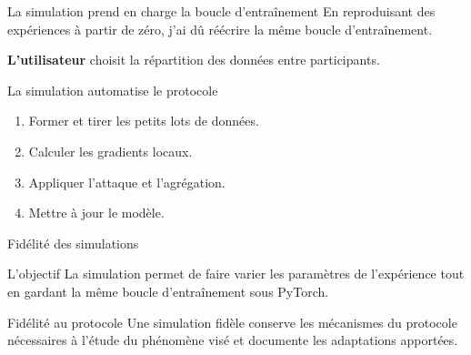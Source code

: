 \begin{frame}{La simulation prend en charge la boucle d'entraînement}
    En reproduisant des expériences à partir de zéro, j'ai dû réécrire
    la même boucle d'entraînement.

    \medskip
    \textbf{L'utilisateur} choisit la répartition des données entre participants.

    \begin{block}{La simulation automatise le protocole}
        \begin{enumerate}
            \item Former et tirer les petits lots de données.
            \item Calculer les gradients locaux.
            \item Appliquer l'attaque et l'agrégation.
            \item Mettre à jour le modèle.
        \end{enumerate}
    \end{block}
\end{frame}

\begin{frame}{Fidélité des simulations}
    \begin{block}{L'objectif}
        La simulation permet de faire varier les paramètres de l'expérience tout en gardant
        la même boucle d'entraînement sous PyTorch.
    \end{block}
    \medskip
    \begin{block}{Fidélité au protocole}
        Une simulation fidèle conserve les mécanismes du protocole nécessaires
        à l'étude du phénomène visé et documente les adaptations apportées.
    \end{block}
\end{frame}
